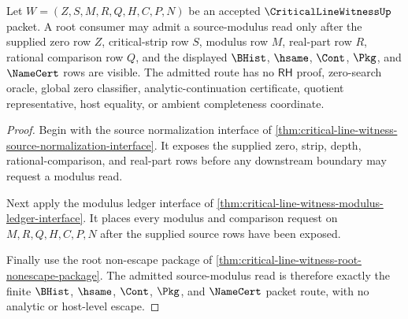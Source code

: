 \begin{theorem}
\label{thm:critical-line-witness-root-source-modulus-admission}
Let $W=(Z,S,M,R,Q,H,C,P,N)$ be an accepted $\CriticalLineWitnessUp$ packet. A root consumer may admit a source-modulus read only after the supplied zero row $Z$, critical-strip row $S$, modulus row $M$, real-part row $R$, rational comparison row $Q$, and the displayed $\BHist$, $\hsame$, $\Cont$, $\Pkg$, and $\NameCert$ rows are visible. The admitted route has no $\mathsf{RH}$ proof, zero-search oracle, global zero classifier, analytic-continuation certificate, quotient representative, host equality, or ambient completeness coordinate.
\end{theorem}
\begin{proof}
Begin with the source normalization interface of \autoref{thm:critical-line-witness-source-normalization-interface}. It exposes the supplied zero, strip, depth, rational-comparison, and real-part rows before any downstream boundary may request a modulus read.

Next apply the modulus ledger interface of \autoref{thm:critical-line-witness-modulus-ledger-interface}. It places every modulus and comparison request on $M,R,Q,H,C,P,N$ after the supplied source rows have been exposed.

Finally use the root non-escape package of \autoref{thm:critical-line-witness-root-nonescape-package}. The admitted source-modulus read is therefore exactly the finite $\BHist$, $\hsame$, $\Cont$, $\Pkg$, and $\NameCert$ packet route, with no analytic or host-level escape.
\end{proof}

